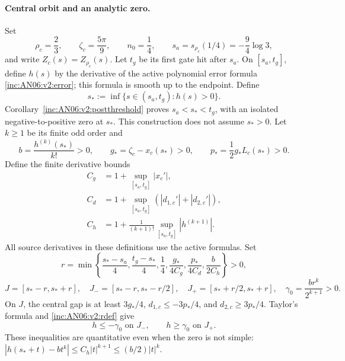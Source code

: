 \documentclass[11pt]{article}
\numberwithin{equation}{section}
\theoremstyle{remark}\newtheorem{remark}[theorem]{Remark}
\newcommand{\1}{\mathbf 1}
\begin{document}
\paragraph{Central orbit and an analytic zero.}
Set
\[
 \rho_c=\frac23,\qquad \zeta_c=\frac{5\pi}{9},\qquad n_0=\frac14,
 \qquad s_a=s_{\rho_c}(1/4)=-\frac94\log3,
\]
and write $Z_c(s)=Z_{\rho_c}(s)$.
Let $t_g$ be its first gate hit after $s_a$.
On $[s_a,t_g]$, define $h(s)$ by the derivative of the active polynomial
error formula \eqref{inc:AN06:v2:error}; this formula is smooth up to the
endpoint. Define
\[
 s_*:=\inf\{s\in(s_a,t_g):h(s)>0\}.
\]
Corollary~\ref{inc:AN06:v2:postthreshold} proves $s_a<s_*<t_g$, with an
isolated negative-to-positive zero at $s_*$. This construction does not
assume $s_*>0$. Let $k\ge1$ be its finite odd order and
\[
 b=\frac{h^{(k)}(s_*)}{k!}>0,\qquad
 g_*=\zeta_c-x_c(s_*)>0,\qquad
 p_*=\frac12g_*L_c(s_*)>0.
\]
Define the finite derivative bounds
\begin{align*}
 C_g&=1+\sup_{[s_a,t_g]}|x_c'|,\\
 C_d&=1+\sup_{[s_a,t_g]}(|d_{1,c}'|+|d_{2,c}'|),\\
 C_h&=1+\frac1{(k+1)!}\sup_{[s_a,t_g]}|h^{(k+1)}|.
\end{align*}
All source derivatives in these definitions use the active formulas.
Set
\begin{equation}\label{inc:AN06:v2:rdef}
 r=\min\left\{\frac{s_*-s_a}{4},\frac{t_g-s_*}{4},\frac14,
 \frac{g_*}{4C_g},\frac{p_*}{4C_d},\frac b{2C_h}\right\}>0,
\end{equation}
\begin{equation}\label{inc:AN06:v2:windows}
 J=[s_*-r,s_*+r],\quad
 J_-=[s_*-r,s_*-r/2],\quad
 J_+=[s_*+r/2,s_*+r],\quad
 \gamma_0=\frac{br^k}{2^{k+1}}>0.
\end{equation}
On $J$, the central gap is at least $3g_*/4$,
$d_{1,c}\le-3p_*/4$, and $d_{2,c}\ge3p_*/4$.
Taylor's formula and \eqref{inc:AN06:v2:rdef} give
\begin{equation}\label{inc:AN06:v2:centralmargins}
 h\le-\gamma_0\text{ on }J_-,\qquad h\ge\gamma_0\text{ on }J_+.
\end{equation}
These inequalities are quantitative even when the zero is not simple:
$|h(s_*+t)-bt^k|\le C_h|t|^{k+1}\le(b/2)|t|^k$.
\end{document}
